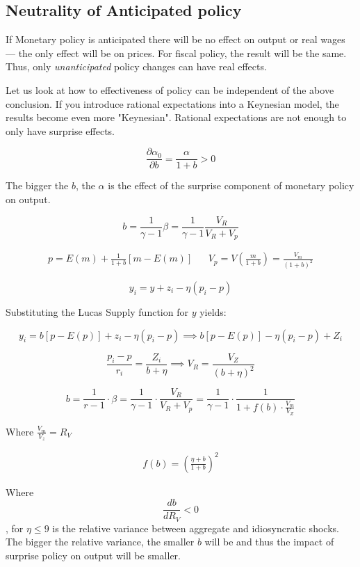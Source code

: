 \subsection{Neutrality of Anticipated policy}

If Monetary policy is anticipated there will be no effect on output or real wages --- the only effect will be on prices. For fiscal policy, the result will be the same. Thus, only \textit{unanticipated} policy changes can have real effects. 

Let us look at how to effectiveness of policy can be independent of the above conclusion. If you introduce rational expectations into a Keynesian model, the results become even more "Keynesian". Rational expectations are not enough to only have surprise effects.

$$
\frac { \partial \alpha_0 } { \partial b } = \frac { \alpha } { 1 + b } > 0
$$

The bigger the $b$, the $\alpha$ is the effect of the surprise component of monetary policy on output.

$$
b = \frac { 1 } { \gamma - 1 } \beta = \frac{1}{\gamma - 1} \frac { V_R } { V _ { R } + V _ { p } }
$$


\begin{align}
     p = E ( m ) + \frac { 1 } { 1 + b } \left[  m - E ( m ) \right] &&
    V_p = V \left( \frac{m}{1 + b} \right) = \frac{V_m}{(1+b)^2}
  \end{align}
  

$$
y _ { i } = y + z _ { i } - \eta\left( p _ { i } - p \right)
$$

Substituting the Lucas Supply function for $y$ yields:

$$
y _ { i } = b [ p - E( p ) ] + z _ { i } - \eta\left( p _ { i } - p \right) \implies b [ p - E( p ) ] - \eta (p_i - p) + Z_i $$

$$
\frac{p_i - p}{r_i} = \frac{Z_i}{b + \eta} \implies V_R = \frac{V_Z}{(b + \eta)^2}
$$




$$
b = \frac{1}{r - 1} \cdot \beta = \frac{1}{\gamma - 1} \cdot \frac{V_R}{V_R + V_p}= \frac{1}{\gamma - 1} \cdot \frac{1}{1 + f(b) \cdot \frac{V_m}{V_Z}}
$$

Where $\tfrac{V_m}{V_z} = R_V$

\begin{align*}
  f ( b ) = \left( \frac { \eta + b } { 1 + b } \right) ^ { 2 }  
\end{align*}

Where $$ \frac { d b } { d R _ { V } } < 0$$, for $\eta \leq 9$ is the relative variance between aggregate and idiosyncratic shocks. The bigger the relative variance, the smaller $b$ will be and thus the impact of surprise policy on output will be smaller. 

